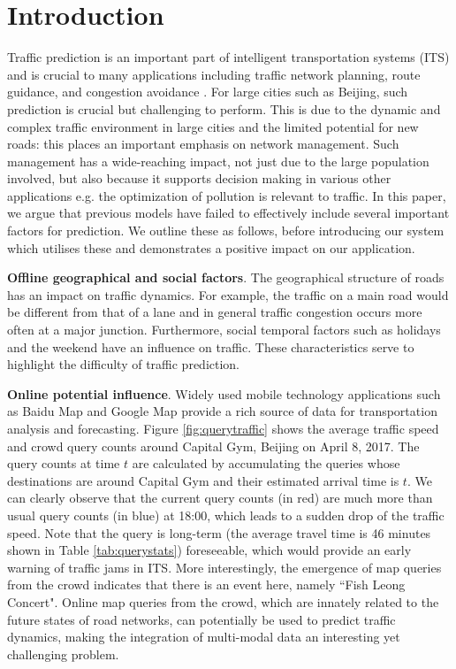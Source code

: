 \section{Introduction}
Traffic prediction is an important part of intelligent transportation systems (ITS) and is crucial to many applications including traffic network planning, route guidance, and congestion avoidance \cite{zhang2011data}. For large cities such as Beijing, such prediction is crucial but challenging to perform. This is due to the dynamic and complex traffic environment in large cities and the limited potential for new roads: this places an important emphasis on network management. Such management has a wide-reaching impact, not just due to the large population involved, but also because it supports decision making in various other applications e.g. the optimization of pollution is relevant to traffic. In this paper, we argue that previous models have failed to effectively include several important factors for prediction. We outline these as follows, before introducing our system which utilises these and demonstrates a positive impact on our application.

\textbf{Offline geographical and social factors}. The geographical structure of roads has an impact on traffic dynamics. For example, the traffic on a main road would be different from that of a lane and in general traffic congestion occurs more often at a major junction. Furthermore, social temporal factors such as holidays and the weekend have an influence on traffic. These characteristics serve to highlight the difficulty of traffic prediction. 

\textbf{Online potential influence}. Widely used mobile technology applications such as Baidu Map and Google Map provide a rich source of data for transportation analysis and forecasting. Figure \ref{fig:querytraffic} shows the average traffic speed and crowd query counts around Capital Gym, Beijing on April 8, 2017. The query counts at time $t$ are calculated by accumulating the queries whose destinations are around Capital Gym and their estimated arrival time is $t$. We can clearly observe that the current query counts (in red) are much more than usual query counts (in blue) at 18:00, which leads to a sudden drop of the traffic speed. Note that the query is long-term (the average travel time is 46 minutes shown in Table \ref{tab:querystats}) foreseeable, which would provide an early warning of traffic jams in ITS. More interestingly, the emergence of map queries from the crowd indicates that there is an event here, namely ``Fish Leong Concert". Online map queries from the crowd, which are innately related to the future states of road networks, can potentially be used to predict traffic dynamics, making the integration of multi-modal data an interesting yet challenging problem. 

